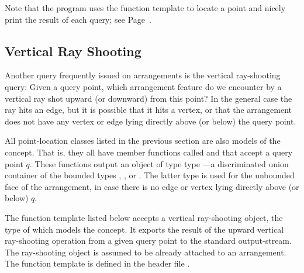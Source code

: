 
Note that the program uses the  function template
to locate a point and nicely print the result of each query; see
Page~\pageref{lst:pl}.

\subsection{Vertical Ray Shooting\label{arr_ssec:ray_shoot}}
Another query frequently issued on arrangements is the vertical
ray-shooting query: Given a query point, which arrangement feature
do we encounter by a vertical ray shot upward (or downward) from this
point? In the general case the ray hits an edge, but it is possible
that it hits a vertex, or that the arrangement does not have any
vertex or edge lying directly above (or below) the query point.

All point-location classes listed in the previous section are also
models of the  concept. That is,
they all have member functions called  and
 that accept a query point $q$. These functions
output an object of type type
---a discriminated
union container of the bounded types ,
, or . The latter type
is used for the unbounded face of the arrangement, in case there is no
edge or vertex lying directly above (or below) $q$.

The function template  listed
below accepts a vertical ray-shooting object, the type of which
models the  concept. It exports
the result of the upward vertical ray-shooting operation from a
given query point to the standard output-stream. The ray-shooting
object  is assumed to be already attached to an arrangement.
The function template is defined in the header file
.

